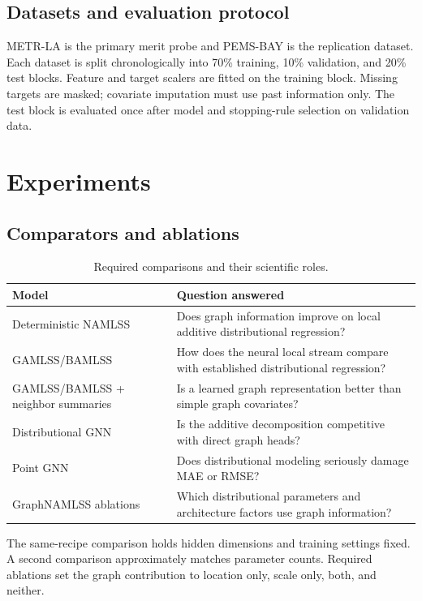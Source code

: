 \documentclass[11pt]{article}
\newcommand{\method}{GraphNAMLSS}
\newcommand{\datasetA}{METR-LA}
\newcommand{\datasetB}{PEMS-BAY}
\begin{document}
\subsection{Datasets and evaluation protocol}

\datasetA{} is the primary merit probe and \datasetB{} is the replication
dataset. Each dataset is split chronologically into 70\% training, 10\%
validation, and 20\% test blocks. Feature and target scalers are fitted on the
training block. Missing targets are masked; covariate imputation must use past
information only. The test block is evaluated once after model and stopping-rule
selection on validation data.

\section{Experiments}
\label{sec:experiments}

\subsection{Comparators and ablations}

\begin{table}[t]
  \centering
  \caption{Required comparisons and their scientific roles.}
  \label{tab:comparators}
  \begin{tabularx}{\linewidth}{lX}
    \toprule
    Model & Question answered\\
    \midrule
    Deterministic NAMLSS
      & Does graph information improve on local additive distributional regression?\\
    GAMLSS/BAMLSS
      & How does the neural local stream compare with established distributional regression?\\
    GAMLSS/BAMLSS + neighbor summaries
      & Is a learned graph representation better than simple graph covariates?\\
    Distributional GNN
      & Is the additive decomposition competitive with direct graph heads?\\
    Point GNN
      & Does distributional modeling seriously damage MAE or RMSE?\\
    \method{} ablations
      & Which distributional parameters and architecture factors use graph information?\\
    \bottomrule
  \end{tabularx}
\end{table}

The same-recipe comparison holds hidden dimensions and training settings fixed.
A second comparison approximately matches parameter counts. Required ablations
set the graph contribution to location only, scale only, both, and neither.
\end{document}
